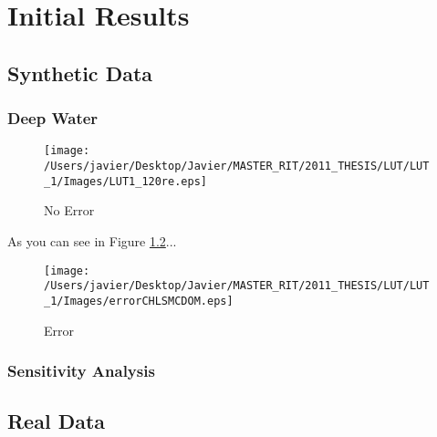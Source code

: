 \chapter{Initial Results}
\section{Synthetic Data}
\subsection{Deep Water}

  \begin{figure}[H]
	\centering
    	\texttt{[image: /Users/javier/Desktop/Javier/MASTER\_RIT/2011\_THESIS/LUT/LUT\_1/Images/LUT1\_120re.eps]}
 	\caption{No Error  \label{fig:errorLUT1}}
  \end{figure}

As you can see in Figure \ref{fig:errorLUT1}...

  \begin{figure}[H]
	\centering
    	\texttt{[image: /Users/javier/Desktop/Javier/MASTER\_RIT/2011\_THESIS/LUT/LUT\_1/Images/errorCHLSMCDOM.eps]}
 	\caption{Error  \label{fig:errorLUT1}}
  \end{figure}


\subsection{Sensitivity Analysis}

\section{Real Data}